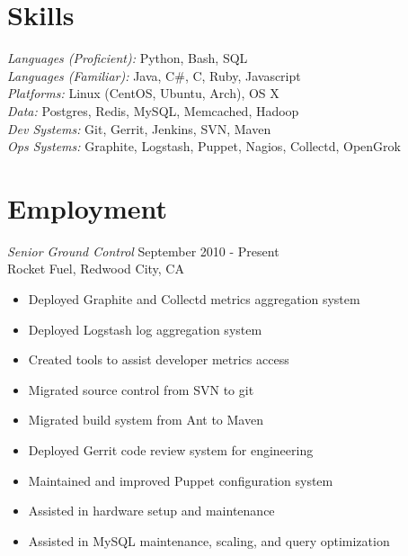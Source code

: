 \documentclass[line,margin]{res}
\begin{document}
\address{Sunnyvale, CA 94087}
\address{\sl tabletcorry@gmail.com}

\begin{resume}
 
\section{Skills} {\sl Languages (Proficient):} Python, Bash, SQL\\
                {\sl Languages (Familiar):} Java, C\#, C, Ruby, Javascript\\
                {\sl Platforms:} Linux (CentOS, Ubuntu, Arch), OS X\\
                {\sl Data:} Postgres, Redis, MySQL, Memcached, Hadoop\\
                {\sl Dev Systems:} Git, Gerrit, Jenkins, SVN, Maven\\
                {\sl Ops Systems:} Graphite, Logstash, Puppet, Nagios, Collectd, OpenGrok
 
\section{Employment} 
                {\sl Senior Ground Control} \hfill September 2010 - Present \\
                Rocket Fuel, Redwood City, CA
                \begin{itemize}  \itemsep -2pt
                 \item Deployed Graphite and Collectd metrics aggregation system
                 \item Deployed Logstash log aggregation system
                 \item Created tools to assist developer metrics access
                 \item Migrated source control from SVN to git
                 \item Migrated build system from Ant to Maven
                 \item Deployed Gerrit code review system for engineering
                 \item Maintained and improved Puppet configuration system
                 \item Assisted in hardware setup and maintenance
                 \item Assisted in MySQL maintenance, scaling, and query optimization
                \end{itemize}


\end{resume}
\end{document}
